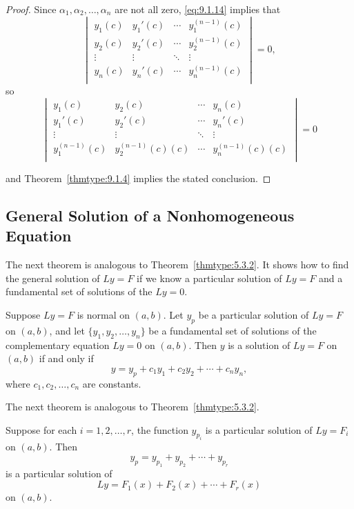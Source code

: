 \documentclass{ximera}
\begin{document}
\begin{proof} Since $\alpha_{1}, \alpha_{2}, \dots, \alpha_{n}$
are not all zero,
\eqref{eq:9.1.14} implies that
$$
\begin{vmatrix}
y_{1}(c)&y_{1}'(c)&\cdots&y_{1}^{(n-1)}(c)\\
y_{2}(c)&y_{2}'(c)&\cdots&y_{2}^{(n-1)}(c)\\
\vdots&\vdots&\ddots&\vdots\\
y_{n}(c)&y_{n}'(c)&\cdots&y_{n}^{(n-1)}(c)\\
\end{vmatrix}=0,
$$
so
$$
\begin{vmatrix}
y_{1}(c)&y_{2}(c)&\cdots& y_{n}(c)\\
y_{1}'(c)&y_{2}'(c)&\cdots& y_{n}'(c)\\
\vdots&\vdots&\ddots&\vdots\\
y_{1}^{(n-1)}(c)&y_{2}^{(n-1)}(c)(c)&\cdots& y_{n}^{(n-1)}(c)(c)\\
\end{vmatrix}=0
$$

and Theorem~\ref{thmtype:9.1.4} implies the stated conclusion.
\end{proof}




\subsection*{General Solution of a Nonhomogeneous Equation}

The next theorem is analogous to
Theorem~\ref{thmtype:5.3.2}.
It shows how to find the general solution of $Ly=F$ if we know a particular
solution of $Ly=F$ and a fundamental set of solutions of the  $Ly=0$.

\begin{theorem}\label{thmtype:9.1.6}
Suppose $Ly=F$ is normal on $(a,b)$. Let $y_p$ be a particular
solution of $Ly=F$ on $(a,b)$, and let $\{y_1,y_2,\dots,y_n\}$ be a
fundamental set of solutions of the complementary equation $Ly=0$ on
$(a,b)$. Then $y$ is a solution of $Ly=F$ on $(a,b)$ if and only if
$$
y=y_p+c_1y_1+c_2y_2+\cdots+c_ny_n,
$$
where $c_1,c_2,\dots,c_n$  are constants.
\end{theorem}

The next theorem is analogous to Theorem~\ref{thmtype:5.3.2}.

\begin{theorem}\label{thmtype:9.1.7}
Suppose for each $i=1, 2, \dots, r$, the function $y_{p_i}$ is a
particular solution of $Ly=F_i$ on  $(a,b)$. Then
$$
y_p=y_{p_1}+y_{p_2}+\cdots+y_{p_r}
$$
is a particular  solution of
$$
Ly=F_1(x)+F_2(x)+\cdots+F_r(x)
$$
on $(a,b)$.
\end{theorem}
\end{document}
